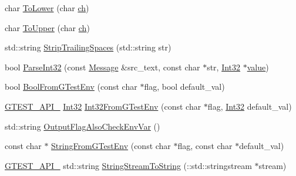 \begin{DoxyCompactItemize}
\item 
char \mbox{\hyperlink{namespacetesting_1_1internal_ad9c627ef2a94245e3fd69e7ab3d49b42}{To\+Lower}} (char \mbox{\hyperlink{_obj__test_2lib_2googletest-master_2googlemock_2test_2gmock-matchers__test_8cc_af53f92900705f7de3c139a05b2f9ef16}{ch}})
\item 
char \mbox{\hyperlink{namespacetesting_1_1internal_ac1b876a8133895bd553d4780ecaa1e3a}{To\+Upper}} (char \mbox{\hyperlink{_obj__test_2lib_2googletest-master_2googlemock_2test_2gmock-matchers__test_8cc_af53f92900705f7de3c139a05b2f9ef16}{ch}})
\item 
std\+::string \mbox{\hyperlink{namespacetesting_1_1internal_aa6afda12e567c353e2e9b9c2e8cae14f}{Strip\+Trailing\+Spaces}} (std\+::string str)
\item 
bool \mbox{\hyperlink{namespacetesting_1_1internal_ac06fc81336a3d80755f4020d34321766}{Parse\+Int32}} (const \mbox{\hyperlink{classtesting_1_1_message}{Message}} \&src\+\_\+text, const char $\ast$str, \mbox{\hyperlink{namespacetesting_1_1internal_af89e21e4043b5cf0c120af487b24fa06}{Int32}} $\ast$\mbox{\hyperlink{_obj__test_2lib_2googletest-master_2googlemock_2test_2gmock-matchers__test_8cc_a337b8a670efc0b086ad3af163f3121b6}{value}})
\item 
bool \mbox{\hyperlink{namespacetesting_1_1internal_a67132cdce23fb71b6c38ee34ef81eb4c}{Bool\+From\+G\+Test\+Env}} (const char $\ast$flag, bool default\+\_\+val)
\item 
\mbox{\hyperlink{_obj__test_2lib_2googletest-release-1_88_81_2googletest_2include_2gtest_2internal_2gtest-port_8h_aa73be6f0ba4a7456180a94904ce17790}{G\+T\+E\+S\+T\+\_\+\+A\+P\+I\+\_\+}} \mbox{\hyperlink{namespacetesting_1_1internal_af89e21e4043b5cf0c120af487b24fa06}{Int32}} \mbox{\hyperlink{namespacetesting_1_1internal_a0f7e728793f9e6cb0aa2b69eaa468bf3}{Int32\+From\+G\+Test\+Env}} (const char $\ast$flag, \mbox{\hyperlink{namespacetesting_1_1internal_af89e21e4043b5cf0c120af487b24fa06}{Int32}} default\+\_\+val)
\item 
std\+::string \mbox{\hyperlink{namespacetesting_1_1internal_a0c793c6d84760d900299916c077a1af4}{Output\+Flag\+Also\+Check\+Env\+Var}} ()
\item 
const char $\ast$ \mbox{\hyperlink{namespacetesting_1_1internal_a7ed785df46a339403b0f749d3a879201}{String\+From\+G\+Test\+Env}} (const char $\ast$flag, const char $\ast$default\+\_\+val)
\item 
\mbox{\hyperlink{_obj__test_2lib_2googletest-release-1_88_81_2googletest_2include_2gtest_2internal_2gtest-port_8h_aa73be6f0ba4a7456180a94904ce17790}{G\+T\+E\+S\+T\+\_\+\+A\+P\+I\+\_\+}} std\+::string \mbox{\hyperlink{namespacetesting_1_1internal_ac0a2b7f69fc829d80a39e925b6417e39}{String\+Stream\+To\+String}} (\+::std\+::stringstream $\ast$stream)

\end{DoxyCompactItemize}
